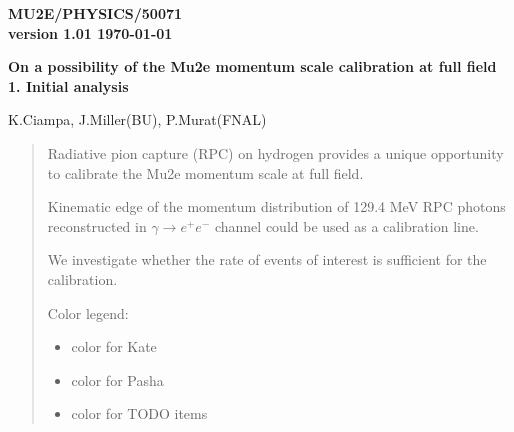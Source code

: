 \documentclass[12pt]{article}
\newcommand {\blue}      {\color{blue}}
\newcommand {\green}     {\color{ForestGreen}}
\newcommand {\red}       {\color{red}}
\newcommand {\pasha}[1]    {{\green  #1}}
\newcommand {\kate}[1]     {{\blue   #1}}
\begin{document}
\begin{titlepage}
  \begin{flushright}
    \bf {MU2E/PHYSICS/50071} \\
    version 1.01
    \today
 \end{flushright}

  \vspace{1cm}

  \begin{center}
    {\Large \bf On a possibility of the Mu2e momentum scale calibration at full field
      \vspace{0.3in}
      1. Initial analysis
    }

    \vspace{1cm}
    K.Ciampa, J.Miller(BU), P.Murat(FNAL)

    \vspace{0.3cm}

    \vspace{0.8cm}
  \end{center}

  \begin{abstract}
    \vspace{0.2in}
    Radiative pion capture (RPC) on hydrogen  provides a unique opportunity to calibrate
    the Mu2e momentum scale at full field.

    Kinematic edge of the momentum distribution of 129.4 MeV RPC photons
    reconstructed in $\gamma \to e^+e^-$ channel could be used as a calibration line.

    We investigate whether the rate of events of interest is sufficient for the calibration.

    Color legend:
    
    \begin{itemize}
    \item
      \kate{color for Kate}
    \item 
      \pasha{color for Pasha}
    \item
      {\red color for TODO items}
    \end{itemize}

      \end{abstract}

\end{titlepage}
%
%
%
{\tableofcontents}
\end{document}
